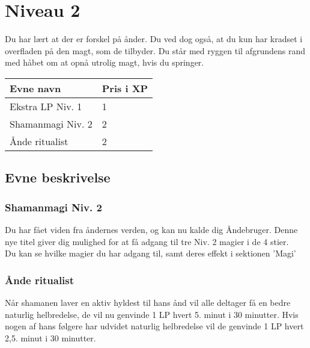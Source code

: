 \chapter*{Niveau 2}
Du har lært at der er forskel på ånder. Du ved dog også, at du kun har kradset i overfladen på den magt, som de tilbyder. Du står med ryggen til afgrundens rand med håbet om at opnå utrolig magt, hvis du springer.

\begin{table}[H]
    \centering
    \begin{tabular}{|p{}|p{}|}
    \rowcolor{cerulean!80}\hline
        Evne navn & Pris i XP \\\hline
    Ekstra LP Niv. 1 & 1 \\\hline
    Shamanmagi Niv. 2& 2 \\\hline
    Ånde ritualist& 2 \\\hline
    \end{tabular}
\end{table}
\section*{Evne beskrivelse}




\subsection*{Shamanmagi Niv. 2}
Du har fået viden fra åndernes verden, og kan nu kalde dig Åndebruger. Denne nye titel giver dig mulighed for at få adgang til tre Niv. 2 magier i de 4 stier.\\
Du kan se hvilke magier du har adgang til, samt deres effekt i sektionen 'Magi'\\

\subsection*{Ånde ritualist}
Når shamanen laver en aktiv hyldest til hans ånd vil alle deltager få en bedre naturlig helbredelse, de vil nu genvinde 1 LP hvert 5. minut i 30 minutter. Hvis nogen af hans følgere har udvidet naturlig helbredelse vil de genvinde 1 LP hvert 2,5. minut i 30 minutter.

